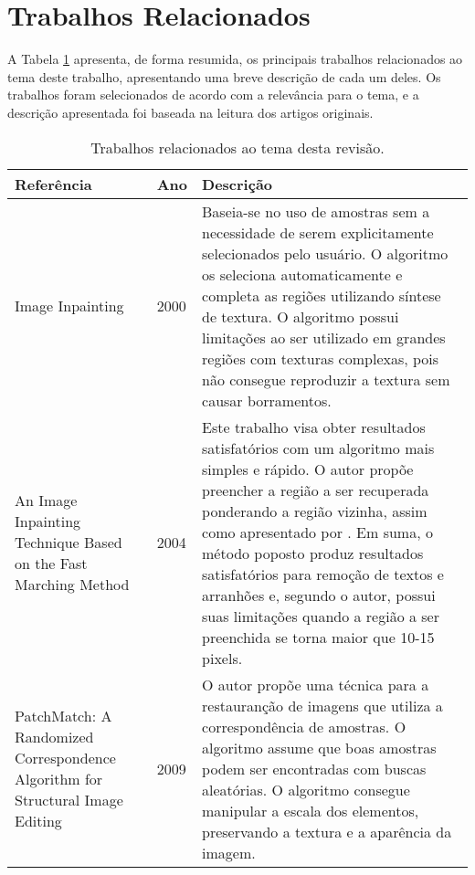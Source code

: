 \section{Trabalhos Relacionados} \label{related}

A Tabela \ref{related-works} apresenta, de forma resumida, os principais trabalhos relacionados ao tema deste trabalho, apresentando uma breve descrição de cada um deles. Os trabalhos foram selecionados de acordo com a relevância para o tema, e a descrição apresentada foi baseada na leitura dos artigos originais.


\begin{longtable}{|p{4cm}|l|p{10cm}|}

\caption{Trabalhos relacionados ao tema desta revisão.} \label{related-works} \\
\hline
\textbf{Referência} & \textbf{Ano} & \textbf{Descrição}  \\ 
\hline
Image Inpainting \cite{Bertalmio2000} & 2000 & Baseia-se no uso de amostras sem a necessidade de serem explicitamente selecionados pelo usuário. O algoritmo os seleciona automaticamente e completa as regiões utilizando síntese de textura. O algoritmo possui limitações ao ser utilizado em grandes regiões com texturas complexas, pois não consegue reproduzir a textura sem causar borramentos. \\

\hline

An Image Inpainting Technique Based on the Fast Marching Method \cite{Telea2004} & 2004 & Este trabalho visa obter resultados satisfatórios com um algoritmo mais simples e rápido. O autor propõe preencher a região a ser recuperada ponderando a região vizinha, assim como apresentado por \cite{Bertalmio2000}. Em suma, o método poposto produz resultados satisfatórios para remoção de textos e arranhões e, segundo o autor, possui suas limitações quando a região a ser preenchida se torna maior que 10-15 pixels. \\

\hline

PatchMatch: A Randomized Correspondence Algorithm for Structural Image Editing \cite{patchmatch2009} & 2009 & O autor propõe uma técnica para a restauranção de imagens que utiliza a correspondência de amostras. O algoritmo assume que boas amostras podem ser encontradas com buscas aleatórias. O algoritmo consegue manipular a escala dos elementos, preservando a textura e a aparência da imagem. \\



\end{longtable}
